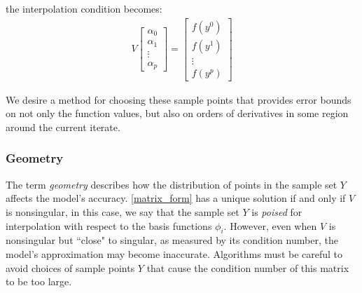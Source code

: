 the interpolation condition becomes:
\begin{align}
\label{matrix_form}
V
\begin{bmatrix}
    \alpha_0     \\
    \alpha_1     \\
    \vdots       \\
    \alpha_p
\end{bmatrix}
=
\begin{bmatrix}
    f(y^0)     \\
    f(y^1)     \\
    \vdots     \\
    f(y^p)
\end{bmatrix}
\end{align}

We desire a method for choosing these sample points that provides error bounds on not only the function values, but also on orders of derivatives in some region around the current iterate.



\subsubsection{Geometry}
\label{geometry}
The term \emph{geometry} describes how the distribution of points in the sample set $Y$ affects the model's accuracy.
\cref{matrix_form} has a unique solution if and only if $V$ is nonsingular, in this case, we say that the sample set $Y$ is \emph{poised} for interpolation with respect to the basis functions $\phi_i$.
However, even when $V$ is nonsingular but ``close" to singular, as measured by its condition number, the model's approximation may become inaccurate.
Algorithms must be careful to avoid choices of sample points $Y$ that cause the condition number of this matrix to be too large.

